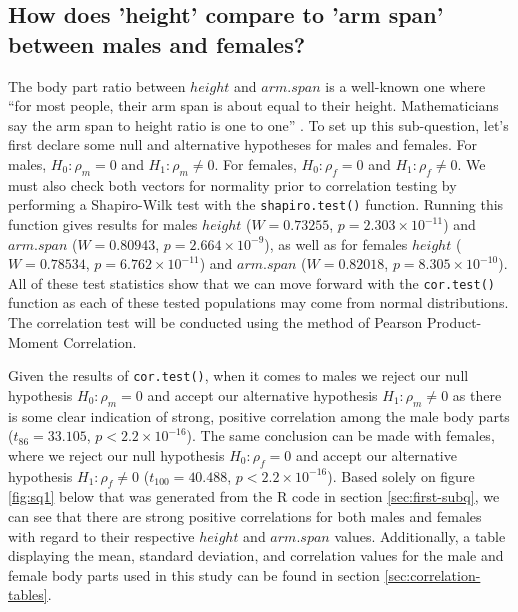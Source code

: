 \documentclass[]{article}
\begin{document}
\subsection{How does 'height' compare to 'arm span' between males and females?}
\label{sec:rq2}

The body part ratio between \(height\) and \(arm.span\) is a well-known
one where ``for most people, their arm span is about equal to their
height. Mathematicians say the arm span to height ratio is one to one''
\citep{Brabandere:2017}. To set up this sub-question, let's first
declare some null and alternative hypotheses for males and females. For
males, \(H_0:\rho_m=0\) and \(H_1:\rho_m\neq0\). For females,
\(H_0:\rho_f=0\) and \(H_1:\rho_f\neq0\). We must also check both
vectors for normality prior to correlation testing by performing a
Shapiro-Wilk test with the \texttt{shapiro.test()} function. Running
this function gives results for males \(height\) (\(W=0.73255\),
\(p=2.303\times10^{-11}\)) and \(arm.span\) (\(W=0.80943\),
\(p=2.664\times10^{-9}\)), as well as for females \(height\)
(\(W=0.78534\), \(p=6.762\times10^{-11}\)) and \(arm.span\)
(\(W=0.82018\), \(p=8.305\times10^{-10}\)). All of these test statistics
show that we can move forward with the \texttt{cor.test()} function as
each of these tested populations may come from normal distributions. The
correlation test will be conducted using the method of Pearson
Product-Moment Correlation.

\vspace{0.25cm}

Given the results of \texttt{cor.test()}, when it comes to males we
reject our null hypothesis \(H_0:\rho_m=0\) and accept our alternative
hypothesis \(H_1:\rho_m\neq0\) as there is some clear indication of
strong, positive correlation among the male body parts
(\(t_{86}=33.105\), \(p<2.2\times10^{-16}\)). The same conclusion can be
made with females, where we reject our null hypothesis \(H_0:\rho_f=0\)
and accept our alternative hypothesis \(H_1:\rho_f\neq0\)
(\(t_{100}=40.488\), \(p<2.2\times10^{-16}\)). Based solely on figure
\ref{fig:sq1} below that was generated from the R code in section
\ref{sec:first-subq}, we can see that there are strong positive
correlations for both males and females with regard to their respective
\(height\) and \(arm.span\) values. Additionally, a table displaying the
mean, standard deviation, and correlation values for the male and female
body parts used in this study can be found in section
\ref{sec:correlation-tables}.
\end{document}
